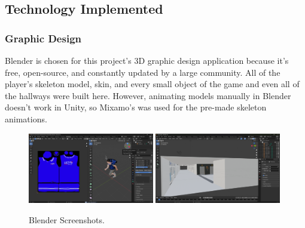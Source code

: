 \documentclass[12pt]{article}
\begin{document}

\clearpage
\subsection{Technology Implemented}
\subsubsection{Graphic Design}
Blender is chosen for this project's 3D graphic design application because it's free, open-source, and constantly updated by a large community. All of the player's skeleton model, skin, and every small object of the game and even all of the hallways were built here. However, animating models manually in Blender doesn't work in Unity, so Mixamo's was used for the pre-made skeleton animations.
\begin{figure}[ht]
    \centering
    \includegraphics[width=0.49\textwidth]{market-blender.png}
    \includegraphics[width=0.49\textwidth]{blend.png}
    \caption{Blender Screenshots.}
\end{figure}
\end{document}
